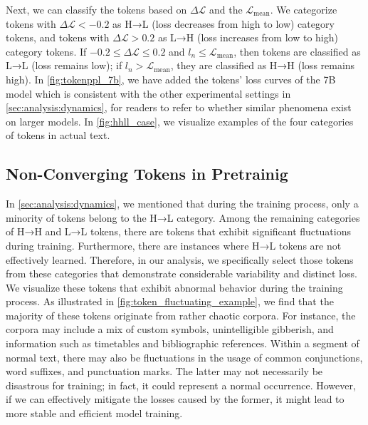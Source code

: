 Next, we can classify the tokens based on $\Delta \mathcal{L}$ and the $\mathcal{L}_{\text{mean}}$. We categorize tokens with $\Delta \mathcal{L} < -0.2$ as H→L (loss decreases from high to low) category tokens, and tokens with $\Delta \mathcal{L} > 0.2$ as L→H (loss increases from low to high) category tokens. If $-0.2 \leq \Delta \mathcal{L} \leq 0.2$ and $l_n \leq \mathcal{L}_{\text{mean}}$, then tokens are classified as L→L (loss remains low); if $l_n >\mathcal{L}_{\text{mean}}$, they are classified as H→H (loss remains high). 
In \autoref{fig:tokenppl_7b}, we have added the tokens' loss curves of the 7B model which is consistent with the other experimental settings in \autoref{sec:analysis:dynamics}, for readers to refer to whether similar phenomena exist on larger models. 
In \autoref{fig:hhll_case}, we visualize examples of the four categories of tokens in actual text.



\subsection{Non-Converging Tokens in Pretrainig}
\label{sec:appendix:non_converging_token}


In \autoref{sec:analysis:dynamics}, we mentioned that during the training process, only a minority of tokens belong to the H→L category. Among the remaining categories of H→H and L→L tokens, there are tokens that exhibit significant fluctuations during training. Furthermore, there are instances where H→L tokens are not effectively learned. Therefore, in our analysis, we specifically select those tokens from these categories that demonstrate considerable variability and distinct loss.
We visualize these tokens that exhibit abnormal behavior during the training process. As illustrated in \autoref{fig:token_fluctuating_example}, we find that the majority of these tokens originate from rather chaotic corpora. For instance, the corpora may include a mix of custom symbols, unintelligible gibberish, and information such as timetables and bibliographic references. Within a segment of normal text, there may also be fluctuations in the usage of common conjunctions, word suffixes, and punctuation marks. The latter may not necessarily be disastrous for training; in fact, it could represent a normal occurrence. However, if we can effectively mitigate the losses caused by the former, it might lead to more stable and efficient model training.